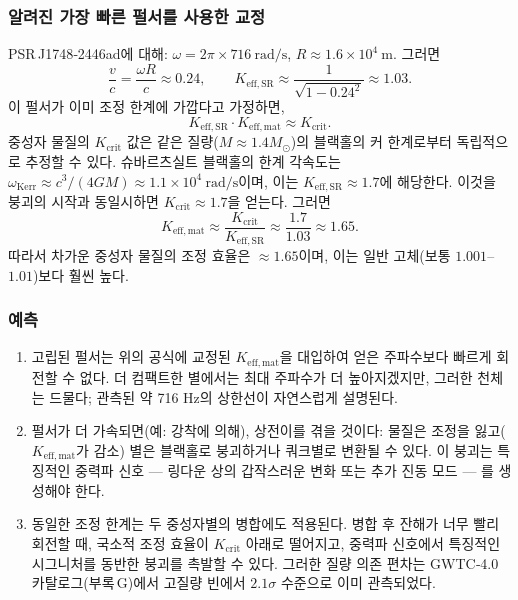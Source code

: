 \documentclass[12pt,a4paper]{article}
\begin{document}
	\subsubsection{알려진 가장 빠른 펄서를 사용한 교정}
	
	PSR J1748‑2446ad에 대해: \(\omega = 2\pi\times716\ \text{rad/s}\), \(R\approx 1.6\times10^4\ \text{m}\). 그러면
	\[
	\frac{v}{c} = \frac{\omega R}{c} \approx 0.24,\qquad
	K_{\mathrm{eff,SR}} \approx \frac{1}{\sqrt{1-0.24^2}} \approx 1.03.
	\]
	이 펄서가 이미 조정 한계에 가깝다고 가정하면,
	\[
	K_{\mathrm{eff,SR}} \cdot K_{\mathrm{eff,mat}} \approx K_{\mathrm{crit}}.
	\]
	중성자 물질의 \(K_{\mathrm{crit}}\) 값은 같은 질량(\(M\approx1.4M_\odot\))의 블랙홀의 커 한계로부터 독립적으로 추정할 수 있다. 슈바르츠실트 블랙홀의 한계 각속도는 \(\omega_{\text{Kerr}} \approx c^3/(4GM) \approx 1.1\times10^4\ \text{rad/s}\)이며, 이는 \(K_{\mathrm{eff,SR}} \approx 1.7\)에 해당한다. 이것을 붕괴의 시작과 동일시하면 \(K_{\mathrm{crit}} \approx 1.7\)을 얻는다. 그러면
	\[
	K_{\mathrm{eff,mat}} \approx \frac{K_{\mathrm{crit}}}{K_{\mathrm{eff,SR}}} \approx \frac{1.7}{1.03} \approx 1.65.
	\]
	따라서 차가운 중성자 물질의 조정 효율은 \(\approx 1.65\)이며, 이는 일반 고체(보통 \(1.001\)–\(1.01\))보다 훨씬 높다.
	
	\subsubsection{예측}
	
	\begin{enumerate}
		\item 고립된 펄서는 위의 공식에 교정된 \(K_{\mathrm{eff,mat}}\)을 대입하여 얻은 주파수보다 빠르게 회전할 수 없다. 더 컴팩트한 별에서는 최대 주파수가 더 높아지겠지만, 그러한 천체는 드물다; 관측된 약 716 Hz의 상한선이 자연스럽게 설명된다.
		\item 펄서가 더 가속되면(예: 강착에 의해), 상전이를 겪을 것이다: 물질은 조정을 잃고(\(K_{\mathrm{eff,mat}}\)가 감소) 별은 블랙홀로 붕괴하거나 쿼크별로 변환될 수 있다. 이 붕괴는 특징적인 중력파 신호 — 링다운 상의 갑작스러운 변화 또는 추가 진동 모드 — 를 생성해야 한다.
		\item 동일한 조정 한계는 두 중성자별의 병합에도 적용된다. 병합 후 잔해가 너무 빨리 회전할 때, 국소적 조정 효율이 \(K_{\mathrm{crit}}\) 아래로 떨어지고, 중력파 신호에서 특징적인 시그니처를 동반한 붕괴를 촉발할 수 있다. 그러한 질량 의존 편차는 GWTC‑4.0 카탈로그(부록 G)에서 고질량 빈에서 \(2.1\sigma\) 수준으로 이미 관측되었다.
	\end{enumerate}
	
\end{document}
